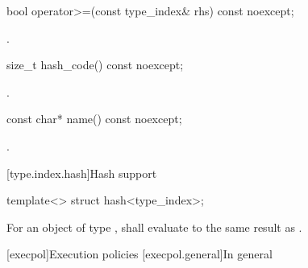 %
\begin{itemdecl}
bool operator>=(const type_index& rhs) const noexcept;
\end{itemdecl}

\begin{itemdescr}
\pnum
\returns {}.
\end{itemdescr}

%
\begin{itemdecl}
size_t hash_code() const noexcept;
\end{itemdecl}

\begin{itemdescr}
\pnum
\returns {}.
\end{itemdescr}

%
\begin{itemdecl}
const char* name() const noexcept;
\end{itemdecl}

\begin{itemdescr}
\pnum
\returns {}.
\end{itemdescr}

[type.index.hash]{Hash support}

%
\begin{itemdecl}
template<> struct hash<type_index>;
\end{itemdecl}

\begin{itemdescr}
\pnum
For an object  of type ,
 shall evaluate to the same result as .
\end{itemdescr}

[execpol]{Execution policies}
[execpol.general]{In general}

